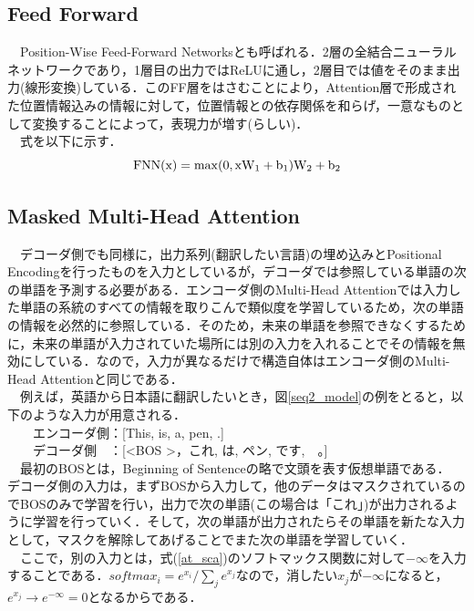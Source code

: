 \documentclass[a4j, 11pt]{jsarticle}
\numberwithin{equation}{section}
\begin{document}
\subsection{Feed Forward}
　Position-Wise Feed-Forward Networksとも呼ばれる．2層の全結合ニューラルネットワークであり，1層目の出力ではReLUに通し，2層目では値をそのまま出力(線形変換)している．このFF層をはさむことにより，Attention層で形成された位置情報込みの情報に対して，位置情報との依存関係を和らげ，一意なものとして変換することによって，表現力が増す(らしい)．\\
　式を以下に示す．\\
\begin{equation}
\rm{FNN}(x) = \max (0, xW_1+b_1)W_2+b_2
\end{equation}

\subsection{Masked Multi-Head Attention}
　デコーダ側でも同様に，出力系列(翻訳したい言語)の埋め込みとPositional Encodingを行ったものを入力としているが，デコーダでは参照している単語の次の単語を予測する必要がある．エンコーダ側のMulti-Head Attentionでは入力した単語の系統のすべての情報を取りこんで類似度を学習しているため，次の単語の情報を必然的に参照している．そのため，未来の単語を参照できなくするために，未来の単語が入力されていた場所には別の入力を入れることでその情報を無効にしている．なので，入力が異なるだけで構造自体はエンコーダ側のMulti-Head Attentionと同じである．\\
　例えば，英語から日本語に翻訳したいとき，図\ref{seq2_model}の例をとると，以下のような入力が用意される．\\

　　エンコーダ側：[This, is, a, pen, .]\\
　　デコーダ側　：[\textless BOS 	\textgreater，これ, は, ペン, です,　。]\\
  
  　最初のBOSとは，Beginning of Sentenceの略で文頭を表す仮想単語である．\\
  デコーダ側の入力は，まずBOSから入力して，他のデータはマスクされているのでBOSのみで学習を行い，出力で次の単語(この場合は「これ」)が出力されるように学習を行っていく．そして，次の単語が出力されたらその単語を新たな入力として，マスクを解除してあげることでまた次の単語を学習していく．\\
  
　ここで，別の入力とは，式(\ref{at_sca})のソフトマックス関数に対して$-\infty$を入力することである．$softmax_i= e^{x_i}/\sum_j e^{x_j}$なので，消したい$x_j$が$-\infty$になると，$e^{x_j} \rightarrow e^{-\infty}=0$となるからである．\\
\end{document}
